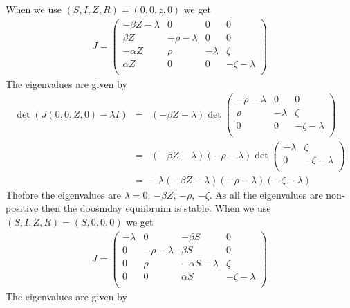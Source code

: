 \documentclass{mm2}
\numberwithin{equation}{section}
\theoremstyle{definition}
\begin{document}
When we use $(S, I, Z, R) = (0, 0, z, 0)$ we get 
\begin{eqnarray}
J = 
\begin{pmatrix}
-\beta Z- \lambda & 0 & 0 & 0 \\
\beta Z & -\rho - \lambda & 0 & 0 \\
-\alpha Z & \rho & - \lambda & \zeta \\
\alpha Z & 0 & 0 & -\zeta - \lambda \\
\end{pmatrix}
\end{eqnarray} 
The eigenvalues are given by
\begin{eqnarray}
\det(J(0, 0, Z, 0)- \lambda I)&=&(-\beta Z - \lambda)\det\begin{pmatrix}
 -\rho - \lambda & 0 & 0 \\
 \rho & - \lambda & \zeta \\
 0 & 0 & -\zeta - \lambda \\
\end{pmatrix} \\
&=& (-\beta Z - \lambda)(-\rho - \lambda)\det\begin{pmatrix}
 - \lambda & \zeta \\
 0 & -\zeta - \lambda \\
\end{pmatrix} \\
&=&-\lambda (-\beta Z - \lambda)(-\rho - \lambda)(-\zeta - \lambda )
\end{eqnarray} 
Thefore the eigenvalues are $\lambda = 0$, $-\beta Z$, $-\rho$, $-\zeta$. As all the eigenvalues are non- positive then the doosmday equiibruim is stable.
When we use $(S, I, Z, R) = (S, 0, 0, 0)$ we get 
\begin{eqnarray}
J = 
\begin{pmatrix}
-\lambda &  0 & -\beta S & 0 \\
0 & -\rho - \lambda & \beta S & 0 \\
0 & \rho & -\alpha S - \lambda & \zeta \\
0 & 0 & \alpha S & -\zeta - \lambda \\
\end{pmatrix}
\end{eqnarray} 
The eigenvalues are given by
\end{document}
